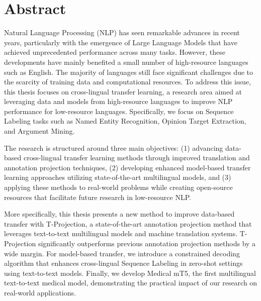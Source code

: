 \chapter*{Abstract}

Natural Language Processing (NLP) has seen remarkable advances in recent years, particularly with the emergence of Large Language Models that have achieved unprecedented performance across many tasks. However, these developments have mainly benefited a small number of high-resource languages such as English. The majority of languages still face significant challenges due to the scarcity of training data and computational resources. To address this issue, this thesis focuses on cross-lingual transfer learning, a research area aimed at leveraging data and models from high-resource languages to improve NLP performance for low-resource languages. Specifically, we focus on Sequence Labeling tasks such as Named Entity Recognition, Opinion Target Extraction, and Argument Mining.

The research is structured around three main objectives: (1) advancing data-based cross-lingual transfer learning methods through improved translation and annotation projection techniques, (2) developing enhanced model-based transfer learning approaches utilizing state-of-the-art multilingual models, and (3) applying these methods to real-world problems while creating open-source resources that facilitate future research in low-resource NLP.

More specifically, this thesis presents a new method to improve data-based transfer with T-Projection, a state-of-the-art annotation projection method that leverages text-to-text multilingual models and machine translation systems. T-Projection significantly outperforms previous annotation projection methods by a wide margin. For model-based transfer, we introduce a constrained decoding algorithm that enhances cross-lingual Sequence Labeling in zero-shot settings using text-to-text models. Finally, we develop Medical mT5, the first multilingual text-to-text medical model, demonstrating the practical impact of our research on real-world applications.